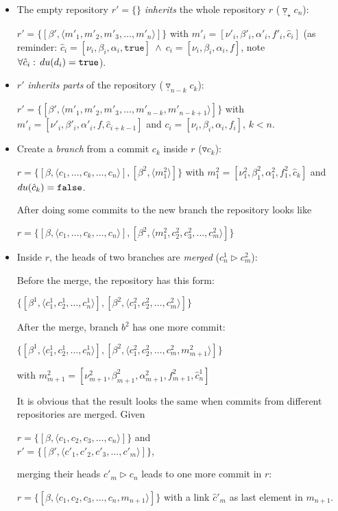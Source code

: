 \documentclass[fleqn, 10pt, a4paper]{article}
\begin{document}
\begin{itemize}
\item The empty repository $r'=\{\}$ \emph{inherits} the whole repository $r$
($\underline\triangledown_\star c_n$):

$r' = \{[\beta', \langle m'_1, m'_2, m'_3, \ldots, m'_n\rangle]\}$ with
$m'_i = [\nu'_i, \beta'_i, \alpha'_i, f'_i, \hat c_i]$ (as reminder:
$\hat c_i = [\nu_i, \beta_i, \alpha_i, \mathtt{true}]\
\wedge\ c_i=[\nu_i, \beta_i, \alpha_i, f]$, note $\forall
\hat c_i:\, \mathnormal{du}(d_i)=\mathtt{true}$).

\item $r'$ \emph{inherits parts} of the repository ($\underline\triangledown_
{n-k}c_k$):

$r'=\{[\beta', \langle m'_1, m'_2, m'_3, \ldots, m'_{n-k}, m'_{n-k+1}\rangle]\}$ with
$m'_i=[\nu'_i, \beta'_i, \alpha'_i, f, \hat c_{i+k-1}]$ and
$c_{i}=[\nu_i, \beta_i, \alpha_i, f_i]$, $k<n$.

\item Create a \emph{branch} from a commit $c_k$ inside $r$
($\triangledown c_k$):

$r = \{[\beta, \langle c_1, \ldots, c_k, \ldots, c_n\rangle], [\beta^2, \langle m_1^2
\rangle]\}$ with $m_1^2=[\nu_1^2, \beta_1^2, \alpha_1^2, f_1^2, \hat c_k]$ and
$\mathnormal{du}(\hat c_k)=\mathtt{false}$.	

After doing some commits to the new branch the repository looks like

$r = \{[\beta, \langle c_1, \ldots, c_k, \ldots, c_n\rangle], [\beta^2, \langle m_1^2,
c_2^2, c_3^2, \ldots, c_m^2\rangle ]\}$

\item Inside $r$, the heads of two branches are \emph{merged}
($c_n^1 \rhd
 c_m^2$):

Before the merge, the repository has this form:

$\{[\beta^1, \langle c_1^1, c_2^1, \ldots, c_n^1\rangle],
[\beta^2, \langle c_1^2, c_2^2, \ldots, c_m^2\rangle]\}$	

After the merge, branch $b^2$ has one more commit:

$\{[\beta^1, \langle c_1^1, c_2^1, \ldots, c_n^1\rangle],
[\beta^2, \langle c_1^2, c_2^2, \ldots, c_m^2, m_{m+1}^2\rangle]\}$

with $m_{m+1}^2=[\nu_{m+1}^2, \beta_{m+1}^2, \alpha_{m+1}^2, f_{m+1}^2,
\hat c_n^1]$

It is obvious that the result looks the same when commits
from different repositories are merged. Given

$r = \{[\beta, \langle c_1, c_2, c_3, \ldots, c_n\rangle]\}$ and \\
$r' = \{[\beta', \langle c'_1, c'_2, c'_3, \ldots, c'_m\rangle]\}$,

merging their heads $c'_m \rhd c_n$ leads to one more commit in
$r$:

$r = \{[\beta, \langle c_1, c_2, c_3, \ldots, c_n, m_{n+1}\rangle]\}$
with a link $\hat c'_m$ as last element in $m_{n+1}$.
\end{itemize}
\end{document}
